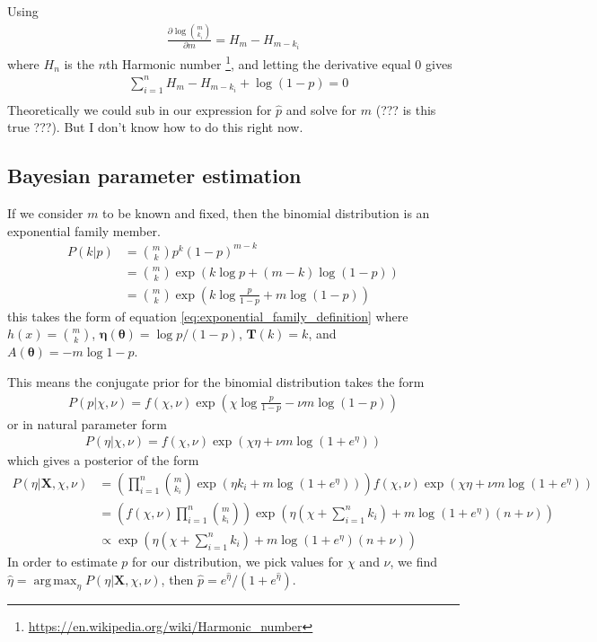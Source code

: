 \documentclass[a4paper,12pt]{article}
\theoremstyle{definition}
\DeclareMathOperator*{\argmax}{arg\,max} %
\newcommand{\pdiff}[2]{\frac{\partial #1}{\partial #2}} %
\begin{document}
Using 
\begin{align}
  \pdiff{\log \binom{m}{k_i}}{m} = H_m - H_{m - k_i}
\end{align}
where $H_n$ is the $n$th Harmonic number \footnote{\url{https://en.wikipedia.org/wiki/Harmonic_number}}, and letting the derivative equal 0 gives 
\begin{align}
   & \sum_{i=1}^n H_m - H_{m - k_i} + \log (1-p) = 0 \\ 
\end{align}
Theoretically we could sub in our expression for $\hat{p}$ and solve for $m$ (??? is this true ???). But I don't know how to do this right now.

\subsection{Bayesian parameter estimation}
If we consider $m$ to be known and fixed, then the binomial distribution is an exponential family member.
\begin{align}
  P(k | p) & = \binom{m}{k} p^{k}(1-p)^{m-k} \\
  & = \binom{m}{k} \exp \left( k \log p + (m-k) \log (1-p) \right) \\
  & = \binom{m}{k} \exp \left( k \log \frac{p}{1-p} + m \log (1-p) \right)
\end{align}
this takes the form of equation \ref{eq:exponential_family_definition} where $h(x) = \binom{m}{k}$, $\boldsymbol{\eta}(\boldsymbol{\theta}) = \log p/(1-p)$, $\mathbf{T}(k) = k$, and $A(\boldsymbol{\theta}) = -m \log 1-p$. 

This means the conjugate prior for the binomial distribution takes the form
\begin{align}
  P(p | \chi, \nu) = f(\chi, \nu) \exp \left( \chi \log \frac{p}{1-p} - \nu m \log (1 - p)  \right)
\end{align}
or in natural parameter form
\begin{align}
  P(\eta | \chi, \nu) = f(\chi, \nu) \exp \left( \chi \eta + \nu m \log (1 + e^{\eta}) \right)
\end{align}
which gives a posterior of the form
\begin{align}
  P(\eta | \mathbf{X}, \chi, \nu) & = \left( \prod_{i=1}^n \binom{m}{k_i} \exp \left( \eta k_i  + m \log (1 + e^{\eta})  \right) \right) f(\chi, \nu) \exp \left( \chi \eta + \nu m \log (1 + e^{\eta})  \right) \\
  & = \left( f(\chi, \nu) \prod_{i=1}^n \binom{m}{k_i} \right) \exp \left( \eta (\chi + \sum_{i=1}^{n} k_i) + m \log ( 1 + e^{\eta})(n + \nu) \right) \\
  & \propto \exp \left( \eta (\chi + \sum_{i=1}^{n} k_i) + m \log ( 1 + e^{\eta})(n + \nu) \right)
\end{align}
In order to estimate $p$ for our distribution, we pick values for $\chi$ and $\nu$, we find $\hat{\eta} = \argmax_{\eta} P(\eta | \mathbf{X}, \chi, \nu)$, then $\hat{p} = e^{\hat{\eta}}/(1 + e^{\hat{\eta}})$.
\end{document}
